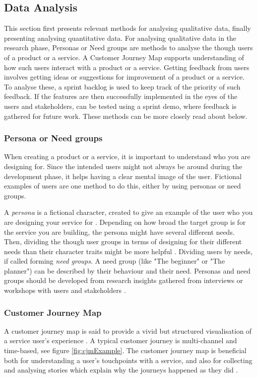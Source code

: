 \subsection{Data Analysis}\label{sec:data-analysis}

This section first presents relevant methods for analysing qualitative data, finally presenting analysing quantitative data. For analysing qualitative data in the research phase, Personas or Need groups are methods to analyse the though users of a product or a service. A Customer Journey Map supports understanding of how such users interact with a product or a service. Getting feedback from users involves getting ideas or suggestions for improvement of a product or a service. To analyse these, a sprint backlog is used to keep track of the priority of such feedback. If the features are then successfully implemented in the eyes of the users and stakeholders, can be tested using a sprint demo, where feedback is gathered for future work. These methods can be more closely read about below.

\subsubsection{Persona or Need groups}
When creating a product or a service, it is important to understand who you are designing for. Since the intended users might not always be around during the development phase, it helps having a clear mental image of the user. Fictional examples of users are one method to do this, either by using personas or need groups.

A \textit{persona} is a fictional character, created to give an example of the user who you are designing your service for \citep{stickdorn}. Depending on how broad the target group is for the service you are building, the persona might have several different needs. Then, dividing the though user groups in terms of designing for their different needs than their character traits might be more helpful \citep{expedition-mondial}. Dividing users by needs, if called forming \textit{need groups}. A need group (like "The beginner" or "The planner") can be described by their behaviour and their need. Personas and need groups should be developed from research insights gathered from interviews or workshops with users and stakeholders \citep{stickdorn}.

\subsubsection{Customer Journey Map}
A customer journey map is said to provide a vivid but structured visualisation of a service user's experience \citep{stickdorn}. A typical customer journey is multi-channel and time-based, see figure \ref{fig:cjmExample}. The customer journey map is beneficial both for understanding a user's touchpoints with a service, and also for collecting and analysing stories which explain why the journeys happened as they did \citep{stickdorn}.

